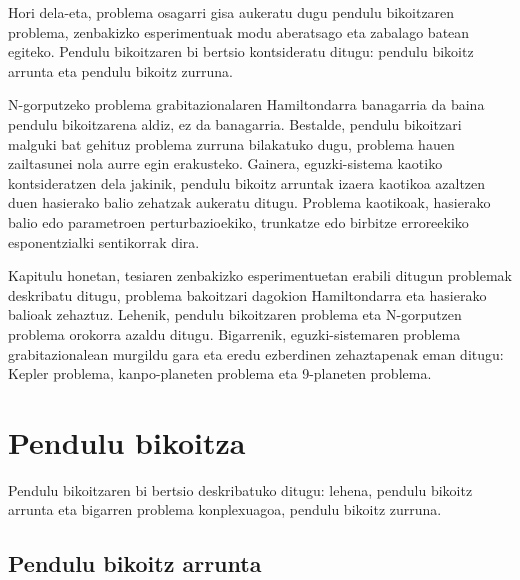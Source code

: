 Hori dela-eta, problema osagarri gisa aukeratu dugu pendulu bikoitzaren problema, zenbakizko esperimentuak modu aberatsago eta zabalago batean egiteko. Pendulu bikoitzaren bi bertsio kontsideratu ditugu: pendulu bikoitz arrunta eta pendulu bikoitz zurruna.

N-gorputzeko problema grabitazionalaren Hamiltondarra banagarria da baina pendulu bikoitzarena aldiz, ez da banagarria. Bestalde, pendulu bikoitzari malguki bat gehituz  problema zurruna bilakatuko dugu, problema hauen zailtasunei nola aurre egin erakusteko. Gainera,  eguzki-sistema kaotiko \cite{Laskar1999}  kontsideratzen dela  jakinik, pendulu bikoitz arruntak izaera kaotikoa azaltzen duen hasierako balio zehatzak aukeratu ditugu. Problema kaotikoak,  hasierako balio edo parametroen perturbazioekiko, trunkatze edo birbitze erroreekiko esponentzialki sentikorrak dira.

Kapitulu honetan, tesiaren zenbakizko esperimentuetan erabili ditugun problemak deskribatu ditugu, problema bakoitzari dagokion Hamiltondarra eta hasierako balioak zehaztuz. Lehenik, pendulu bikoitzaren problema eta N-gorputzen problema orokorra azaldu ditugu. Bigarrenik, eguzki-sistemaren problema grabitazionalean murgildu gara eta eredu ezberdinen zehaztapenak eman ditugu: Kepler problema, kanpo-planeten problema eta 9-planeten problema. 

\section{Pendulu bikoitza}
\label{s:32}

Pendulu bikoitzaren bi bertsio deskribatuko ditugu: lehena, pendulu bikoitz arrunta eta bigarren problema konplexuagoa, pendulu bikoitz zurruna. 

\subsection{Pendulu bikoitz arrunta}
\label{ss:321}


